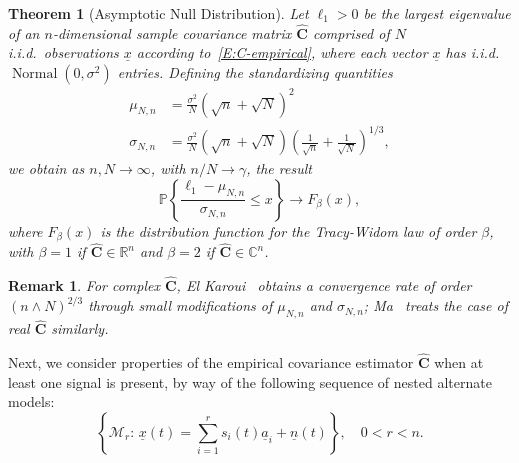 \documentclass[final]{IEEEtran}
\newtheorem{theorem}{Theorem}
\newtheorem{rem}{Remark}
\newcommand{\vectorsymbol}{\underline}
\newcommand{\matrixsymbol}{\boldsymbol}
\newcommand{\mhC}{\widehat{\matrixsymbol{C}}}
\newcommand{\va}{\vectorsymbol{a}}
\newcommand{\vn}{\vectorsymbol{n}}
\newcommand{\vx}{\vectorsymbol{x}}
\newcommand{\Prob}{\mathbb{P}}
\begin{document}
\begin{theorem}[Asymptotic Null Distribution]\label{T:null-value}
    Let $\ell_1 > 0$ be the largest eigenvalue of an $n$-dimensional sample covariance matrix $\mhC$ comprised of $N$ i.i.d.~observations $\vx$ according to~\eqref{E:C-empirical}, where each vector $\vx$ has i.i.d.~$\operatorname{Normal}(0,\sigma^2)$ entries. Defining the standardizing quantities
    \begin{align*}
        \mu_{N,n}
            &=
            \frac{\sigma^2}{N}
            \left( \sqrt{n} + \sqrt{N} \right)^2 \\
        \sigma_{N,n}
            &=
            \frac{\sigma^2}{N} \textstyle
            \left( \sqrt{n} + \sqrt{N} \right)
            \left( \frac{1}{\sqrt{n}} + \frac{1}{\sqrt{N}} \right)^{1/3},
    \end{align*}
    we obtain as $n,N\to\infty$, with $n/N\to \gamma$, the result
    \begin{equation*}
        \Prob \left\{ \frac{\ell_1 - \mu_{N,n}}{\sigma_{N,n}} \leq x \right\}
        \to
        F_\beta ( x ),
    \end{equation*}
    where $F_\beta( x )$ is the distribution function for the Tracy-Widom law of
    order $\beta$, with $\beta = 1$ if $\mhC \in \mathbb{R}^n$ and $\beta = 2$ if $\mhC \in \mathbb{C}^n$.
\end{theorem}

\begin{rem}
For complex $\mhC$, El Karoui~\cite{elkaroui2006rcr} obtains a convergence rate of order $(n\wedge N)^{2/3}$ through small modifications of $\mu_{N,n}$ and $\sigma_{N,n}$; Ma~\cite{ma2008atw} treats the case of real $\mhC$ similarly.
\end{rem}

Next, we consider properties of the empirical covariance estimator $\mhC$ when at least one signal is present, by way of the following sequence of nested alternate models:
\begin{equation}\label{E:SignalAlt}
    \left\{ \mathcal{M}_r\!:\, \vx(t) = \sum_{i=1}^{r} s_{i}(t) \va_{i} + \vn(t) \right\}, \quad 0 < r < n.
\end{equation}
\end{document}

